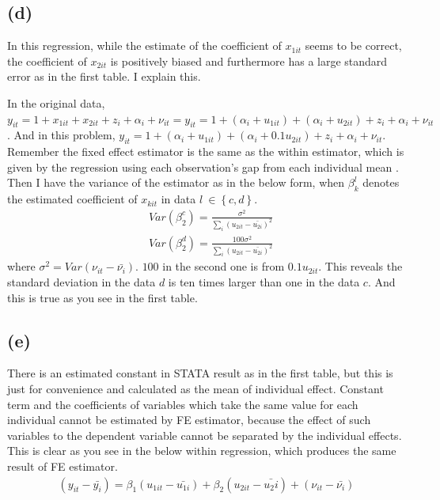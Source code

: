 \documentclass{article}
\begin{document}
\subsection{(d)}
In this regression, while the estimate of the coefficient of $x_{1it}$ seems to be correct, the coefficient of $x_{2it}$ is positively biased and furthermore has a large standard error as in the first table. I explain this.

In the original data, $y_{it} = 1 + x_{1it} + x_{2it} + z_i + \alpha_i + \nu_{it} = y_{it} = 1 + \left( \alpha_i + u_{1it} \right) + \left( \alpha_i + u_{2it} \right) + z_i + \alpha_i + \nu_{it}$. And in this problem, $y_{it} = 1 + \left( \alpha_i + u_{1it} \right) + \left( \alpha_i + 0.1 u_{2it} \right) + z_i + \alpha_i + \nu_{it}$. Remember the fixed effect estimator is the same as the within estimator, which is given by the regression using each observation's gap from each individual mean . Then I have the variance of the estimator as in the below form, when $\beta_k^l$ denotes the estimated coefficient of $x_{kit}$ in data $l\ \in \left\{ c, d\right\}$.
\begin{align*}
	&Var\left( \beta_2^c \right) = \frac{\sigma^2}{\sum_i (u_{2it} - \bar{u_{2i}})^2}\\
	&Var\left( \beta_2^d \right) = \frac{100\sigma^2}{\sum_i (u_{2it} - \bar{u_{2i}})^2}
\end{align*}
where $\sigma^2 = Var(\nu_{it} - \bar{\nu_i})$. $100$ in the second one is from $0.1 u_{2it}$. This reveals the standard deviation in the data $d$ is ten times larger than one in the data $c$. And this is true as you see in the first table.

\subsection{(e)}
There is an estimated constant in STATA result as in the first table, but this is just for convenience and calculated as the mean of individual effect. Constant term and the coefficients of variables which take the same value for each individual cannot be estimated by FE estimator, because the effect of such variables to the dependent variable cannot be separated by the individual effects. This is clear as you see in the below within regression, which produces the same result of FE estimator.
\begin{align*}
	(y_{it} - \bar{y_i}) = \beta_1 (u_{1it} - \bar{u_{1i}}) + \beta_2 (u_{2it} - \bar{u_2i}) + (\nu_{it} - \bar{\nu_i})
\end{align*}
\end{document}
